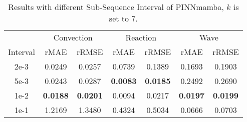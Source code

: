 \begin{table}[H]
\vspace{-3mm}
  \caption{Results with different Sub-Sequence Interval of PINNmamba, $k$ is set to 7.}
  
  \centering
    \small
  \begin{tabular}{c|cc|cc|cc}

    \toprule 
      &\multicolumn{2}{c}{Convection }&\multicolumn{2}{c}{Reaction}&\multicolumn{2}{c}{Wave}\\
    \cmidrule(lr){2-3}\cmidrule(lr){4-5}\cmidrule(lr){6-7}
   Interval & rMAE & rRMSE & rMAE & rRMSE & rMAE & rRMSE\\
   \midrule
   2e-3 &0.0249& 0.0257 & 0.0739 & 0.1389 &0.1693 &0.1903  \\
 5e-3 & 0.0243& 0.0287& \textbf{0.0083} & \textbf{0.0185} & 0.2492 & 0.2690 \\
 1e-2 &\textbf{0.0188} & \textbf{0.0201} &0.0094 &0.0217 & \textbf{0.0197} &  \textbf{0.0199}\\
 1e-1 & 1.2169 &1.3480 &0.4324& 0.5034   &0.0666 &  0.0703\\

    

   

    \bottomrule
  \end{tabular}
  \normalsize
  \label{tab:interval}

\end{table}
